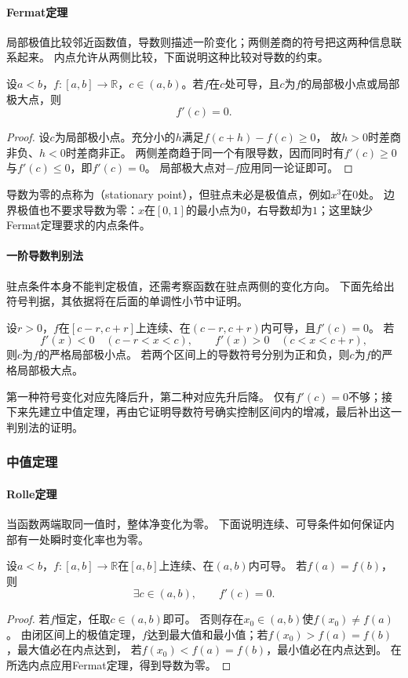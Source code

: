\paragraph{Fermat定理}
局部极值比较邻近函数值，导数则描述一阶变化；两侧差商的符号把这两种信息联系起来。
内点允许从两侧比较，下面说明这种比较对导数的约束。
\begin{theorem}[Fermat定理]
\label{thm:analysis-fermat}
设$a<b$，$f:[a,b]\to\mathbb R$，$c\in(a,b)$。若$f$在$c$处可导，且$c$为$f$的局部极小点或局部极大点，则
\begin{equation}
 f'(c)=0.
\label{eq:analysis-scalar-first-order-necessary}
\end{equation}
\end{theorem}
\begin{proof}
设$c$为局部极小点。充分小的$h$满足$f(c+h)-f(c)\geq0$，
故$h>0$时差商非负、$h<0$时差商非正。
两侧差商趋于同一个有限导数，因而同时有$f'(c)\geq0$与$f'(c)\leq0$，即$f'(c)=0$。
局部极大点对$-f$应用同一论证即可。
\end{proof}
导数为零的点称为（stationary point），但驻点未必是极值点，例如$x^3$在$0$处。
边界极值也不要求导数为零：$x$在$[0,1]$的最小点为$0$，右导数却为$1$；这里缺少Fermat定理要求的内点条件。

\paragraph{一阶导数判别法}
驻点条件本身不能判定极值，还需考察函数在驻点两侧的变化方向。
下面先给出符号判据，其依据将在后面的单调性小节中证明。
\begin{theorem}[一阶导数判别法]
\label{thm:analysis-first-derivative-test}
设$r>0$，$f$在$[c-r,c+r]$上连续、在$(c-r,c+r)$内可导，且$f'(c)=0$。
若
\[
 f'(x)<0\quad(c-r<x<c),\qquad
 f'(x)>0\quad(c<x<c+r),
\]
则$c$为$f$的严格局部极小点。
若两个区间上的导数符号分别为正和负，则$c$为$f$的严格局部极大点。
\end{theorem}
第一种符号变化对应先降后升，第二种对应先升后降。
仅有$f'(c)=0$不够；接下来先建立中值定理，再由它证明导数符号确实控制区间内的增减，最后补出这一判别法的证明。

\subsubsection{中值定理}

\paragraph{Rolle定理}
当函数两端取同一值时，整体净变化为零。
下面说明连续、可导条件如何保证内部有一处瞬时变化率也为零。
\begin{theorem}[Rolle定理]
\label{thm:analysis-rolle}
设$a<b$，$f:[a,b]\to\mathbb R$在$[a,b]$上连续、在$(a,b)$内可导。
若$f(a)=f(b)$，则
\[
 \exists c\in(a,b),\qquad f'(c)=0.
\]
\end{theorem}
\begin{proof}
若$f$恒定，任取$c\in(a,b)$即可。
否则存在$x_0\in(a,b)$使$f(x_0)\neq f(a)$。
由闭区间上的极值定理，$f$达到最大值和最小值；若$f(x_0)>f(a)=f(b)$，最大值必在内点达到，
若$f(x_0)<f(a)=f(b)$，最小值必在内点达到。
在所选内点应用Fermat定理，得到导数为零。
\end{proof}

